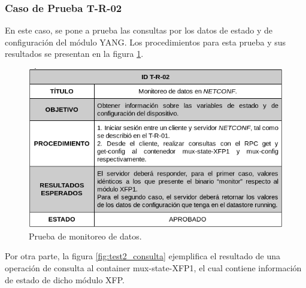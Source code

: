   \subsubsection{Caso de Prueba T-R-02}
  En este caso, se pone a prueba las consultas por los datos de estado y de configuración del módulo YANG. Los procedimientos para esta prueba y sus resultados se presentan en la figura \ref{fig:test2}. 



\begin{figure}[H]
	\centering
	\includegraphics[scale=0.6]{Figures/test2.png}
	\caption{Prueba de monitoreo de datos.}
	\label{fig:test2}
  \end{figure}

  Por otra parte, la figura \ref{fig:test2_consulta} ejemplifica el resultado de una operación de consulta al container mux-state-XFP1, el cual contiene información de estado de dicho módulo XFP.


